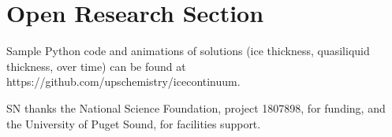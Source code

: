 \documentclass[draft]{agujournal2019}
\begin{document}
%








%
%

\section*{Open Research Section}
Sample Python code and animations of solutions (ice thickness, quasiliquid thickness, over time) can be found at https://github.com/upschemistry/icecontinuum.

\acknowledgments
SN thanks the National Science Foundation, project 1807898, for funding, and the University of Puget Sound, for facilities support.


%


\end{document}
